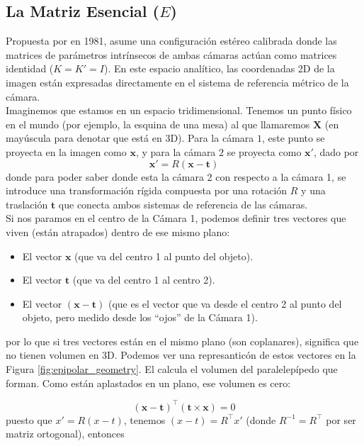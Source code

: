 \subsection{La Matriz Esencial ($E$)}
\noindent
Propuesta por  en 1981, asume una configuración estéreo calibrada donde las matrices de parámetros intrínsecos de ambas cámaras actúan como matrices identidad ($K = K' = I$). En este espacio analítico, las coordenadas 2D de la imagen están expresadas directamente en el sistema de referencia métrico de la cámara. \\

\noindent
Imaginemos que estamos en un espacio tridimensional. Tenemos un punto físico en el mundo (por ejemplo, la esquina de una mesa) al que llamaremos $\mathbf{X}$ (en mayúscula para denotar que está en 3D). Para la cámara $1$, este punto se proyecta en la imagen como $\mathbf{x}$, y para la cámara $2$ se proyecta como $\mathbf{x}'$, dado por
\begin{equation*}
    \mathbf{x}' = R(\mathbf{x} - \mathbf{t})
\end{equation*}
donde para poder saber donde esta la cámara 2 con respecto a la cámara 1, se introduce una transformación rígida compuesta por una rotación $R$ y una traslación $\mathbf{t}$ que conecta ambos sistemas de referencia de las cámaras.\\

\noindent
Si nos paramos en el centro de la Cámara 1, podemos definir tres vectores que viven (están atrapados) dentro de ese mismo plano:
\begin{itemize}
    \item El vector $\mathbf{x}$ (que va del centro 1 al punto del objeto).
    \item El vector $\mathbf{t}$ (que va del centro 1 al centro 2).
    \item El vector $(\mathbf{x} - \mathbf{t})$ (que es el vector que va desde el centro 2 al punto del objeto, pero medido desde los ``ojos'' de la Cámara 1).
\end{itemize}
por lo que si tres vectores están en el mismo plano (son coplanares), significa que no tienen volumen en 3D. Podemos ver una represanticón de estos vectores en la Figura \ref{fig:epipolar_geometry}. El  calcula el volumen del paralelepípedo que forman. Como están aplastados en un plano, ese volumen es cero:

$$(\mathbf{x} - \mathbf{t})^\top (\mathbf{t} \times \mathbf{x}) = 0$$
puesto que $x'=R(x-t)$, tenemos $(x-t)=R^{\top}x'$ (donde $R^{-1} = R^{\top}$ por ser matriz ortogonal), entonces

